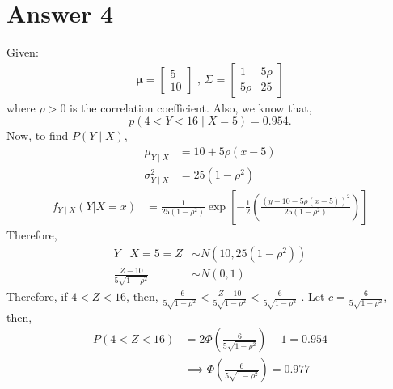 \documentclass[a4paper]{article}
\begin{document}
\section{Answer 4}
Given:
\begin{equation*}
	\begin{split}
		\mathbf{\mu} = \begin{bmatrix} 5\\10 \end{bmatrix} \text{ , } \Sigma = \begin{bmatrix} 1 & 5\rho \\ 5\rho & 25 \end{bmatrix} 
	\end{split}
\end{equation*}
where $\rho > 0$ is the correlation coefficient.
\newline\newline
Also, we know that,
\[
	p\left( 4 < Y < 16  \mid  X = 5 \right) = 0.954
.\]
Now, to find $P\left( Y \mid X \right) $,
\begin{equation*}
	\begin{split}
	\mu_{Y \mid X} &= 10 + 5\rho\left( x - 5 \right)  \\
	\sigma_{Y \mid X}^2&= 25\left( 1- \rho^2 \right) 
	\end{split}
\end{equation*}
\begin{equation*}
	\begin{split}
	f_{Y \mid X}\left( Y | X = x\right) &= \frac{1}{25\left( 1-\rho^2 \right) } \exp\left[ -\frac{1}{2}\left( \frac{(y - 10 - 5\rho\left( x-5 \right) )^2}{25\left( 1-\rho^2 \right) } \right)  \right] 	
	\end{split}
\end{equation*}
Therefore, 
\begin{equation*}
	\begin{split}
		Y  \mid X = 5 = Z &\sim N\left( 10, 25\left( 1-\rho^2 \right)  \right) \\
		\frac{Z - 10}{5\sqrt{1-\rho^2} } &\sim N\left( 0,1 \right) 
	\end{split}
\end{equation*}
Therefore, if $4< Z < 16$, then, $\frac{-6}{5\sqrt{1-\rho^2} } < \frac{Z - 10}{5\sqrt{1-\rho^2} } < \frac{6}{5\sqrt{1-\rho^2}  }$ .
\newline\newline
Let $c = \frac{6}{5\sqrt{1-\rho^2} }$, then,
\begin{equation*}
	\begin{split}
		P\left( 4 <Z < 16 \right) &=  2\Phi\left( \frac{6}{5\sqrt{1-\rho^2} } \right) - 1= 0.954\\ 
		&\implies \Phi\left( \frac{6}{5\sqrt{1-\rho^2} } \right)  = 0.977 
	\end{split}
\end{equation*}
\end{document}
